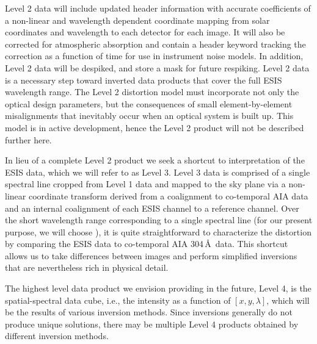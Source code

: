 Level 2 data will include updated header information with accurate coefficients of a non-linear and wavelength dependent coordinate mapping from solar coordinates and wavelength to each detector for each image. It will also be corrected for atmospheric absorption and contain a header keyword tracking the correction as a function of time for use in instrument noise models.
In addition, Level 2 data will be despiked, and store a mask for future respiking.
Level 2 data is a necessary step toward inverted data products that cover the full ESIS wavelength range. The Level 2 distortion model must incorporate not only the optical design parameters, but the consequences of small element-by-element misalignments that inevitably occur when an optical system is built up.  This model is in active development, hence the Level 2 product will not be described further here.

In lieu of a complete Level 2 product we seek a shortcut to interpretation of the ESIS data, which  we will refer to as Level 3.
Level 3 data is comprised of a single spectral line cropped from Level 1 data and mapped to the sky plane via a non-linear coordinate transform derived from a coalignment to co-temporal AIA data and an internal coalignment of each ESIS channel to a reference channel. Over the short wavelength range corresponding to a single spectral line (for our present purpose, we will choose \ov), it is quite straightforward to characterize the distortion by comparing the ESIS data to co-temporal AIA 304\,\AA\ data. This shortcut allows us to take differences between images and perform simplified inversions that are nevertheless rich in physical detail.

   

    
The highest level data product we envision providing in the future, Level 4, is the spatial-spectral data cube, i.e., the intensity as a function of $[x, y , \lambda]$, which will be the results of various inversion methods.    
Since inversions generally do not produce unique solutions, there may be multiple Level 4 products obtained by different inversion methods.

